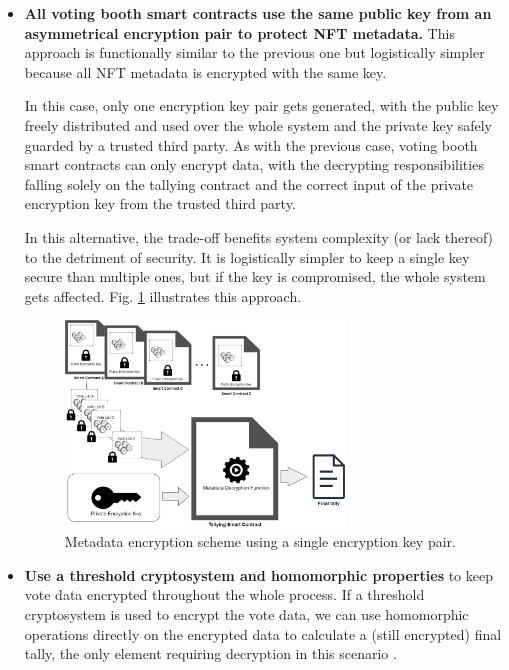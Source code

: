 \documentclass[./4_GeneralApproach.tex]{subfiles}
\begin{document}
\begin{itemize}
        \item{\textbf{All voting booth smart contracts use the same public key from an asymmetrical encryption pair to protect NFT metadata.} This approach is functionally similar to the previous one but logistically simpler because all NFT metadata is encrypted with the same key.
        \par
        In this case, only one encryption key pair gets generated, with the public key freely distributed and used over the whole system and the private key safely guarded by a trusted third party. As with the previous case, voting booth smart contracts can only encrypt data, with the decrypting responsibilities falling solely on the tallying contract and the correct input of the private encryption key from the trusted third party.
        \par
        In this alternative, the trade-off benefits system complexity (or lack thereof) to the detriment of security. It is logistically simpler to keep a single key secure than multiple ones, but if the key is compromised, the whole system gets affected. Fig. \ref{fig:single_encryption_key_scheme} illustrates this approach.
        }

        \begin{figure}[htp]
            \centering
            \includegraphics[width=0.7\textwidth]{../Images/ContractBasedSolution_encryption2.png}
            \caption{Metadata encryption scheme using a single encryption key pair.}
            \label{fig:single_encryption_key_scheme}
        \end{figure}   

        \item{\textbf{Use a threshold cryptosystem and homomorphic properties} to keep vote data encrypted throughout the whole process. If a threshold cryptosystem is used to encrypt the vote data, we can use homomorphic operations directly on the encrypted data to calculate a (still encrypted) final tally, the only element requiring decryption in this scenario \cite{Benaloh1986b} \cite{Rjaskova2002}.}


\end{itemize}
\end{document}
